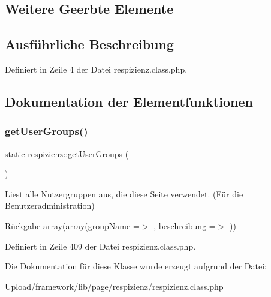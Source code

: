 \subsection*{Weitere Geerbte Elemente}


\subsection{Ausführliche Beschreibung}


Definiert in Zeile 4 der Datei respizienz.\+class.\+php.



\subsection{Dokumentation der Elementfunktionen}
\mbox{\label{classrespizienz_a1555a3169044bf6ea827ac4731bcf90b}} 
\subsubsection{\texorpdfstring{get\+User\+Groups()}{getUserGroups()}}
{\footnotesize\ttfamily static respizienz\+::get\+User\+Groups (\begin{DoxyParamCaption}{ }\end{DoxyParamCaption})\hspace{0.3cm}{\ttfamily [static]}}

Liest alle Nutzergruppen aus, die diese Seite verwendet. (Für die Benutzeradministration) \begin{DoxyReturn}{Rückgabe}
array(array(\textquotesingle{}group\+Name\textquotesingle{} =$>$ \textquotesingle{}\textquotesingle{}, \textquotesingle{}beschreibung\textquotesingle{} =$>$ \textquotesingle{}\textquotesingle{})) 
\end{DoxyReturn}


Definiert in Zeile 409 der Datei respizienz.\+class.\+php.



Die Dokumentation für diese Klasse wurde erzeugt aufgrund der Datei\+:\begin{DoxyCompactItemize}
\item 
Upload/framework/lib/page/respizienz/respizienz.\+class.\+php\end{DoxyCompactItemize}
